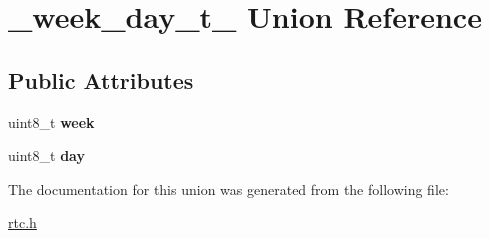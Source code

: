 \hypertarget{union__week__day__t__}{}\section{\+\_\+week\+\_\+day\+\_\+t\+\_\+ Union Reference}
\label{union__week__day__t__}
\subsection*{Public Attributes}
\begin{DoxyCompactItemize}
\item 
\mbox{\label{union__week__day__t___a79590db9a0a77c158f3f94373d660dc6}} 
uint8\+\_\+t {\bfseries week}
\item 
\mbox{\label{union__week__day__t___a48e6241190d81f2e47f7ce8f8defb4a1}} 
uint8\+\_\+t {\bfseries day}
\end{DoxyCompactItemize}


The documentation for this union was generated from the following file\+:\begin{DoxyCompactItemize}
\item 
\hyperlink{rtc_8h}{rtc.\+h}\end{DoxyCompactItemize}

